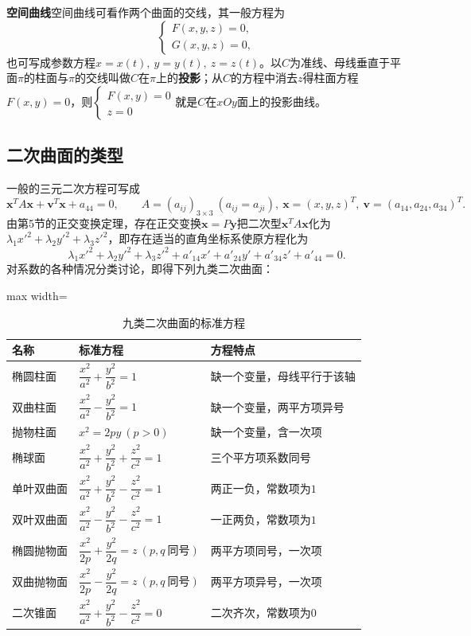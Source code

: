 \textbf{空间曲线}\quad 空间曲线可看作两个曲面的交线，其一般方程为
\[
\begin{cases}F(x,y,z)=0,\\ G(x,y,z)=0,\end{cases}
\]
也可写成参数方程$x=x(t),\ y=y(t),\ z=z(t)$。以$C$为准线、母线垂直于平面$\pi$的柱面与$\pi$的交线叫做$C$在$\pi$上的\textbf{投影}；从$C$的方程中消去$z$得柱面方程$F(x,y)=0$，则$\begin{cases}F(x,y)=0\\ z=0\end{cases}$就是$C$在$xOy$面上的投影曲线。

\subsection{二次曲面的类型}
一般的三元二次方程可写成
\[
\boldsymbol{x}^{T}A\boldsymbol{x}+\boldsymbol{v}^{T}\boldsymbol{x}+a_{44}=0,
\qquad
A=(a_{ij})_{3\times3}\ (a_{ij}=a_{ji}),\ \boldsymbol{x}=(x,y,z)^{T},\ \boldsymbol{v}=(a_{14},a_{24},a_{34})^{T}.
\]
由第5节的正交变换定理，存在正交变换$\boldsymbol{x}=P\boldsymbol{y}$把二次型$\boldsymbol{x}^{T}A\boldsymbol{x}$化为$\lambda_1x'^{2}+\lambda_2y'^{2}+\lambda_3z'^{2}$，即存在适当的直角坐标系使原方程化为
\[
\lambda_1x'^{2}+\lambda_2y'^{2}+\lambda_3z'^{2}+a'_{14}x'+a'_{24}y'+a'_{34}z'+a'_{44}=0 .
\]
对系数的各种情况分类讨论，即得下列九类二次曲面：

\begin{table}[htbp]
\centering
\caption{九类二次曲面的标准方程}
\begin{adjustbox}{max width=\linewidth}
\begin{tabular}{@{}lll@{}}
\toprule
名称 & 标准方程 & 方程特点\\
\midrule
椭圆柱面 & $\dfrac{x^{2}}{a^{2}}+\dfrac{y^{2}}{b^{2}}=1$ & 缺一个变量，母线平行于该轴\\
双曲柱面 & $\dfrac{x^{2}}{a^{2}}-\dfrac{y^{2}}{b^{2}}=1$ & 缺一个变量，两平方项异号\\
抛物柱面 & $x^{2}=2py\ (p>0)$ & 缺一个变量，含一次项\\
椭球面 & $\dfrac{x^{2}}{a^{2}}+\dfrac{y^{2}}{b^{2}}+\dfrac{z^{2}}{c^{2}}=1$ & 三个平方项系数同号\\
单叶双曲面 & $\dfrac{x^{2}}{a^{2}}+\dfrac{y^{2}}{b^{2}}-\dfrac{z^{2}}{c^{2}}=1$ & 两正一负，常数项为$1$\\
双叶双曲面 & $\dfrac{x^{2}}{a^{2}}-\dfrac{y^{2}}{b^{2}}-\dfrac{z^{2}}{c^{2}}=1$ & 一正两负，常数项为$1$\\
椭圆抛物面 & $\dfrac{x^{2}}{2p}+\dfrac{y^{2}}{2q}=z\ (p,q\ \text{同号})$ & 两平方项同号，一次项\\
双曲抛物面 & $\dfrac{x^{2}}{2p}-\dfrac{y^{2}}{2q}=z\ (p,q\ \text{同号})$ & 两平方项异号，一次项\\
二次锥面 & $\dfrac{x^{2}}{a^{2}}+\dfrac{y^{2}}{b^{2}}-\dfrac{z^{2}}{c^{2}}=0$ & 二次齐次，常数项为$0$\\
\bottomrule
\end{tabular}
\end{adjustbox}
\end{table}


